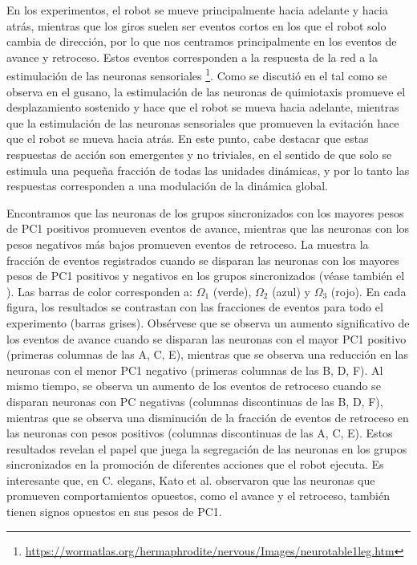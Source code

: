 En los experimentos, el robot se mueve principalmente hacia adelante y hacia atrás, mientras que los giros suelen ser eventos cortos en los que el robot solo cambia de dirección, por lo que nos centramos principalmente en los eventos de avance y retroceso. Estos eventos corresponden a la respuesta de la red a la estimulación de las neuronas sensoriales \footnote{\url{https://wormatlas.org/hermaphrodite/nervous/Images/neurotable1leg.htm}}.  Como se discutió en el   tal como se observa en el gusano, la estimulación de las neuronas de quimiotaxis promueve el desplazamiento sostenido y hace que el robot se mueva hacia adelante, mientras que la estimulación de las neuronas sensoriales que promueven la evitación hace que el robot se mueva hacia atrás. En este punto, cabe destacar que estas respuestas de acción son emergentes y no triviales, en el sentido de que solo se estimula una pequeña fracción de todas las unidades dinámicas, y por lo tanto las respuestas corresponden a una modulación de la dinámica global.


Encontramos que las neuronas de los grupos sincronizados con los mayores pesos de PC1 positivos promueven eventos de avance, mientras que las neuronas con los pesos negativos más bajos promueven eventos de retroceso. La  muestra la fracción de eventos registrados cuando se disparan las neuronas con los mayores pesos de PC1 positivos y negativos en los grupos sincronizados (véase también el ). Las barras de color corresponden a: $\Omega_1$ (verde), $\Omega_2$ (azul) y $\Omega_3$ (rojo). En cada figura, los resultados se contrastan con las fracciones de eventos para todo el experimento (barras grises). Obsérvese que se observa un aumento significativo de los eventos de avance cuando se disparan las neuronas con el mayor PC1 positivo (primeras columnas de las A, C, E), mientras que se observa una reducción en las neuronas con el menor PC1 negativo (primeras columnas de las B, D, F). Al mismo tiempo, se observa un aumento de los eventos de retroceso cuando se disparan neuronas con PC negativas (columnas discontinuas de las B, D, F), mientras que se observa una disminución de la fracción de eventos de retroceso en las neuronas con pesos positivos (columnas discontinuas de las A, C, E). Estos resultados revelan el papel que juega la segregación de las neuronas en los grupos sincronizados en la promoción de diferentes acciones que el robot ejecuta. Es interesante que, en C. elegans, Kato et al. \cite{kato_global_2015} observaron que las neuronas que promueven comportamientos opuestos, como el avance y el retroceso, también tienen signos opuestos en sus pesos de PC1.

